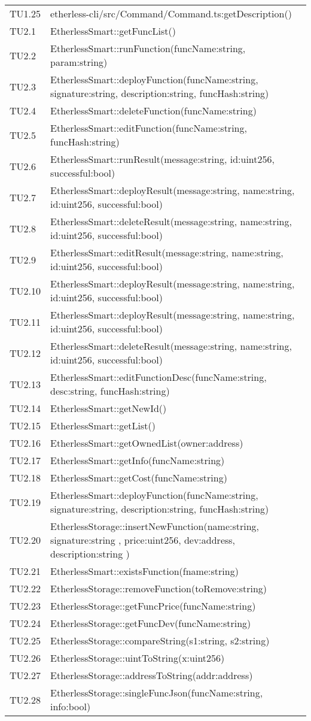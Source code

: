 \begin{longtable}{
		>{\centering}p{}
		>{}p{}}
	TU1.25 & etherless-cli/src/Command/Command.ts:getDescription() \\
	TU2.1  &  EtherlessSmart::getFuncList()  \tabularnewline
	TU2.2  &  EtherlessSmart::runFunction(funcName:string, param:string)  \tabularnewline
	TU2.3  &  EtherlessSmart::deployFunction(funcName:string, signature:string, description:string, funcHash:string)  \tabularnewline
	TU2.4  &  EtherlessSmart::deleteFunction(funcName:string)  \tabularnewline
	TU2.5  &  EtherlessSmart::editFunction(funcName:string, funcHash:string)  \tabularnewline
	TU2.6  &  EtherlessSmart::runResult(message:string, id:uint256, successful:bool)  \tabularnewline
	TU2.7  &  EtherlessSmart::deployResult(message:string, name:string, id:uint256, successful:bool)  \tabularnewline
	TU2.8  &  EtherlessSmart::deleteResult(message:string, name:string, id:uint256, successful:bool)  \tabularnewline
	TU2.9  &  EtherlessSmart::editResult(message:string, name:string, id:uint256, successful:bool)  \tabularnewline
	TU2.10 &  EtherlessSmart::deployResult(message:string, name:string, id:uint256, successful:bool)  \tabularnewline
	TU2.11 &  EtherlessSmart::deployResult(message:string, name:string, id:uint256, successful:bool)  \tabularnewline
	TU2.12 &  EtherlessSmart::deleteResult(message:string, name:string, id:uint256, successful:bool)  \tabularnewline
	TU2.13 &  EtherlessSmart::editFunctionDesc(funcName:string, desc:string, funcHash:string)  \tabularnewline
	TU2.14 &  EtherlessSmart::getNewId()  \tabularnewline
	TU2.15 &  EtherlessSmart::getList()  \tabularnewline
	TU2.16 &  EtherlessSmart::getOwnedList(owner:address)  \tabularnewline
	TU2.17 &  EtherlessSmart::getInfo(funcName:string)  \tabularnewline
	TU2.18 &  EtherlessSmart::getCost(funcName:string)  \tabularnewline
	TU2.19 &  EtherlessSmart::deployFunction(funcName:string, signature:string, description:string, funcHash:string)  \tabularnewline
	TU2.20 &  EtherlessStorage::insertNewFunction(name:string, signature:string , price:uint256, dev:address, description:string )  \tabularnewline
	TU2.21 &  EtherlessSmart::existsFunction(fname:string)  \tabularnewline
	TU2.22 &  EtherlessStorage::removeFunction(toRemove:string)  \tabularnewline
	TU2.23 &  EtherlessStorage::getFuncPrice(funcName:string)  \tabularnewline
	TU2.24 &  EtherlessStorage::getFuncDev(funcName:string)  \tabularnewline
	TU2.25 &  EtherlessStorage::compareString(s1:string, s2:string)  \tabularnewline
	TU2.26 &  EtherlessStorage::uintToString(x:uint256)  \tabularnewline
	TU2.27 &  EtherlessStorage::addressToString(addr:address)  \tabularnewline
	TU2.28 &  EtherlessStorage::singleFuncJson(funcName:string, info:bool)  \tabularnewline

\end{longtable}

